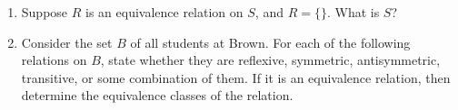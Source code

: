 \documentclass[12pt,letterpaper]{article}
\begin{document}
\begin{enumerate}[1.]
\begin{enumerate}[a.]
				\item What is the equivalence relation on $A$ with the largest number of equivalence classes possible?
				
				\begin{mdframed} \vspace{1cm} \end{mdframed}

				\item Is  $R_0 = \{\}$ a relation on $A$?

				\begin{mdframed} \vspace{1cm} \end{mdframed}

				\item Is $R_0$ symmetric? Is it antisymmetric? Why or why not?
				
				\begin{mdframed} \vspace{2cm} \end{mdframed}

				\item Is $R_0$ transitive? Why or why not?

				\begin{mdframed} \vspace{2cm} \end{mdframed}

				\item 	$R_0$ is not an equivalence relation. Why?
				
				\begin{mdframed} \vspace{1cm} \end{mdframed}
		\end{enumerate}

 
    \item Suppose $R$ is an equivalence relation on $S$, and $R = \{\}$. What is $S$? 
        
        \begin{mdframed} \vspace{1cm} \end{mdframed}

		\item Consider the set $B$ of all students at Brown. For each of the following relations on $B$, state whether they are reflexive, symmetric, antisymmetric, transitive, or some combination of them. If it is an equivalence relation, then determine the equivalence classes of the relation.
		

\end{enumerate}
\end{document}
